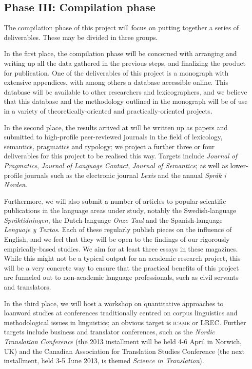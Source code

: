 \documentclass[a4paper]{article}
\begin{document}

\subsection{Phase III: Compilation phase}

The compilation phase of this project will focus on putting together a series of deliverables. These may be divided in three groups.

In the first place, the compilation phase will be concerned with arranging and writing up all the data gathered in the previous steps, and finalizing the product for publication. One of the deliverables of this project is a monograph with extensive appendices, with among others a database accessible online. This database will be available to other researchers and lexicographers, and we believe that this database and the methodology outlined in the monograph will be of use in a variety of theoretically-oriented and practically-oriented projects.

In the second place, the results arrived at will be written up as papers and submitted to high-profile peer-reviewed journals in the field of lexicology, semantics, pragmatics and typology; we project a further three or four deliverables for this project to be realised this way. Targets include \emph{Journal of Pragmatics}, \emph{Journal of Language Contact}, \emph{Journal of Semantics}; as well as lower-profile journals such as the electronic journal \emph{Lexis} and the annual \emph{Spr\aa k i Norden}.

Furthermore, we will also submit a number of articles to popular-scientific publications in the language areas under study, notably the Swedish-language \emph{Spr\aa ktidningen}, the Dutch-language \emph{Onze Taal} and the Spanish-language \\ \emph{Lenguaje y Textos}. Each of these regularly publish pieces on the influence of English, and we feel that they will be open to the findings of our rigorously empirically-based studies. We aim for at least three essays in these magazines. While this might not be a typical output for an academic research project, this will be a very concrete way to ensure that the practical benefits of this project are funneled out to non-academic language professionals, such as civil servants and translators.

In the third place, we will host a workshop on quantitative approaches to loanword studies at conferences traditionally centred on corpus linguistics and methodological issues in linguistics; an obvious target is \textsc{icame} or LREC. Further targets include business and translator conferences, such as the \emph{Nordic Translation Conference} (the 2013 installment will be held 4-6 April in Norwich, UK) and the Canadian Association for Translation Studies Conference (the next installment, held 3-5 June 2013, is themed \emph{Science in Translation}). 
\end{document}

